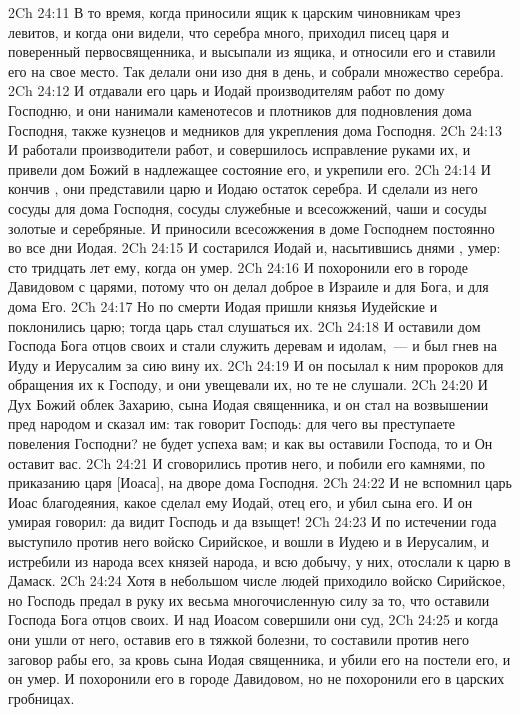 \vs 2Ch 24:11 В то время, когда приносили ящик к царским чиновникам чрез левитов, и когда они видели, что серебра много, приходил писец царя и поверенный первосвященника, и высыпали из ящика, и относили его и ставили его на свое место. Так делали они изо дня в день, и собрали множество серебра.
\vs 2Ch 24:12 И отдавали его царь и Иодай производителям работ по дому Господню, и они нанимали каменотесов и плотников для подновления дома Господня, также кузнецов и медников для укрепления дома Господня.
\vs 2Ch 24:13 И работали производители работ, и совершилось исправление руками их, и привели дом Божий в надлежащее состояние его, и укрепили его.
\vs 2Ch 24:14 И кончив , они представили царю и Иодаю остаток серебра. И сделали из него сосуды для дома Господня, сосуды служебные и  всесожжений, чаши и  сосуды золотые и серебряные. И приносили всесожжения в доме Господнем постоянно во все дни Иодая.
\rsbpar\vs 2Ch 24:15 И состарился Иодай и, насытившись днями , умер: сто тридцать лет  ему, когда он умер.
\vs 2Ch 24:16 И похоронили его в городе Давидовом с царями, потому что он делал доброе в Израиле и для Бога, и для дома Его.
\rsbpar\vs 2Ch 24:17 Но по смерти Иодая пришли князья Иудейские и поклонились царю; тогда царь стал слушаться их.
\vs 2Ch 24:18 И оставили дом Господа Бога отцов своих и стали служить деревам  и идолам,~--- и был гнев  на Иуду и Иерусалим за сию вину их.
\vs 2Ch 24:19 И он посылал к ним пророков для обращения их к Господу, и они увещевали их, но те не слушали.
\vs 2Ch 24:20 И Дух Божий облек Захарию, сына Иодая священника, и он стал на возвышении пред народом и сказал им: так говорит Господь: для чего вы преступаете повеления Господни? не будет успеха вам; и как вы оставили Господа, то и Он оставит вас.
\vs 2Ch 24:21 И сговорились против него, и побили его камнями, по приказанию царя [Иоаса], на дворе дома Господня.
\vs 2Ch 24:22 И не вспомнил царь Иоас благодеяния, какое сделал ему Иодай, отец его, и убил сына его. И он умирая говорил: да видит Господь и да взыщет!
\rsbpar\vs 2Ch 24:23 И по истечении года выступило против него войско Сирийское, и вошли в Иудею и в Иерусалим, и истребили из народа всех князей народа, и всю добычу,  у них, отослали к царю в Дамаск.
\vs 2Ch 24:24 Хотя в небольшом числе людей приходило войско Сирийское, но Господь предал в руку их весьма многочисленную силу за то, что оставили Господа Бога отцов своих. И над Иоасом совершили они суд,
\vs 2Ch 24:25 и когда они ушли от него, оставив его в тяжкой болезни, то составили против него заговор рабы его, за кровь сына Иодая священника, и убили его на постели его, и он умер. И похоронили его в городе Давидовом, но не похоронили его в царских гробницах.
